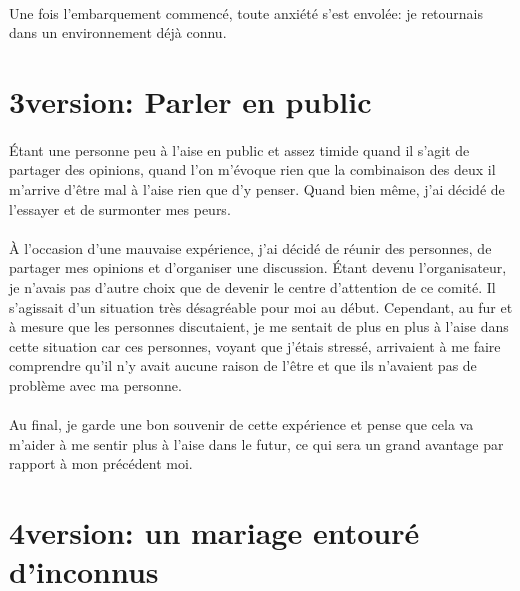 \paragraph{} Une fois l'embarquement commencé, toute anxiété s'est envolée: je
retournais dans un environnement déjà connu.

\section{3\ieme version: Parler en public}

\paragraph{} Étant une personne peu à l'aise en public et assez timide quand il
s'agit de partager des opinions, quand l'on m'évoque rien que la combinaison
des deux il m'arrive d'être mal à l'aise rien que d'y penser. Quand bien même,
j'ai décidé de l'essayer et de surmonter mes peurs.

\paragraph{} À l'occasion d'une mauvaise expérience, j'ai décidé de réunir des
personnes, de partager mes opinions et d'organiser une discussion. Étant devenu
l'organisateur, je n'avais pas d'autre choix que de devenir le centre
d'attention de ce comité. Il s'agissait d'un situation très désagréable pour
moi au début. Cependant, au fur et à mesure que les personnes discutaient, je
me sentait de plus en plus à l'aise dans cette situation car ces personnes,
voyant que j'étais stressé, arrivaient à me faire comprendre qu'il n'y avait
aucune raison de l'être et que ils n'avaient pas de problème avec ma personne.

\paragraph{} Au final, je garde une bon souvenir de cette expérience et pense
que cela va m'aider à me sentir plus à l'aise dans le futur, ce qui sera un
grand avantage par rapport à mon précédent moi.

\section[4\ieme version: le mariage]{4\ieme version: un mariage entouré d'inconnus}

